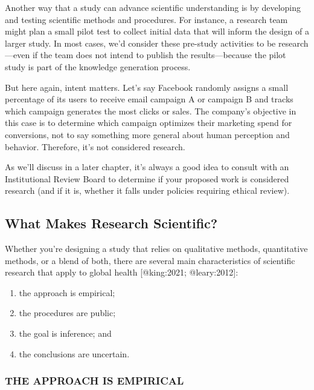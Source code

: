 \documentclass[
  letterpaper,
  DIV=11,
  numbers=noendperiod,
  oneside]{scrartcl}
\providecommand{\tightlist}{%
  \setlength{\itemsep}{0pt}\setlength{\parskip}{0pt}}\usepackage{longtable,booktabs,array}
\begin{document}
Another way that a study can advance scientific understanding is by
developing and testing scientific methods and procedures. For instance,
a research team might plan a small pilot test to collect initial data
that will inform the design of a larger study. In most cases, we'd
consider these pre-study activities to be research---even if the team
does not intend to publish the results---because the pilot study is part
of the knowledge generation process.

But here again, intent matters. Let's say Facebook randomly assigns a
small percentage of its users to receive email campaign A or campaign B
and tracks which campaign generates the most clicks or sales. The
company's objective in this case is to determine which campaign
optimizes their marketing spend for conversions, not to say something
more general about human perception and behavior. Therefore, it's not
considered research.

As we'll discuss in a later chapter, it's always a good idea to consult
with an Institutional Review Board to determine if your proposed work is
considered research (and if it is, whether it falls under policies
requiring ethical review).

\hypertarget{what-makes-research-scientific}{%
\subsection{What Makes Research
Scientific?}\label{what-makes-research-scientific}}

Whether you're designing a study that relies on qualitative methods,
quantitative methods, or a blend of both, there are several main
characteristics of scientific research that apply to global health
{[}@king:2021; @leary:2012{]}:

\begin{enumerate}
\def\labelenumi{\arabic{enumi}.}
\tightlist
\item
  the approach is empirical;
\item
  the procedures are public;
\item
  the goal is inference; and
\item
  the conclusions are uncertain.
\end{enumerate}

\hypertarget{the-approach-is-empirical}{%
\subsubsection*{THE APPROACH IS
EMPIRICAL}\label{the-approach-is-empirical}}
\end{document}
